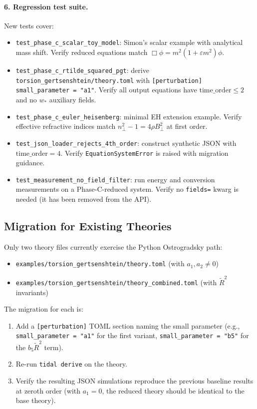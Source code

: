 \paragraph{6. Regression test suite.} New tests cover:
\begin{itemize}
  \item \texttt{test\_phase\_c\_scalar\_toy\_model}: Simon's scalar example with analytical mass shift. Verify reduced equations match $\Box\phi = m^2(1+\varepsilon m^2)\phi$.
  \item \texttt{test\_phase\_c\_rtilde\_squared\_pgt}: derive \texttt{torsion\_gertsenshtein/theory.toml} with \texttt{[perturbation] small\_parameter = "a1"}. Verify all output equations have $\mathrm{time\_order} \leq 2$ and no $w_*$ auxiliary fields.
  \item \texttt{test\_phase\_c\_euler\_heisenberg}: minimal EH extension example. Verify effective refractive indices match $n_\perp^2 - 1 = 4\rho B^2_\perp$ at first order.
  \item \texttt{test\_json\_loader\_rejects\_4th\_order}: construct synthetic JSON with $\mathrm{time\_order} = 4$. Verify \texttt{EquationSystemError} is raised with migration guidance.
  \item \texttt{test\_measurement\_no\_field\_filter}: run energy and conversion measurements on a Phase-C-reduced system. Verify no \texttt{fields=} kwarg is needed (it has been removed from the API).
\end{itemize}

\subsection{Migration for Existing Theories}
\label{sec:prd-migration}

Only two theory files currently exercise the Python Ostrogradsky path:
\begin{itemize}
  \item \texttt{examples/torsion\_gertsenshtein/theory.toml} (with $a_1, a_2 \neq 0$)
  \item \texttt{examples/torsion\_gertsenshtein/theory\_combined.toml} (with $\tilde{R}^2$ invariants)
\end{itemize}

The migration for each is:
\begin{enumerate}
  \item Add a \texttt{[perturbation]} TOML section naming the small parameter (e.g., \texttt{small\_parameter = "a1"} for the first variant, \texttt{small\_parameter = "b5"} for the $b_5 \tilde{R}^2$ term).
  \item Re-run \texttt{tidal derive} on the theory.
  \item Verify the resulting JSON simulations reproduce the previous baseline results at zeroth order (with $a_1 = 0$, the reduced theory should be identical to the base theory).
\end{enumerate}

